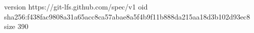 version https://git-lfs.github.com/spec/v1
oid sha256:f438fac9808a31a65acc8ca57abae8a5f4b9f11b888da215aa18d3b102d93ec8
size 390
